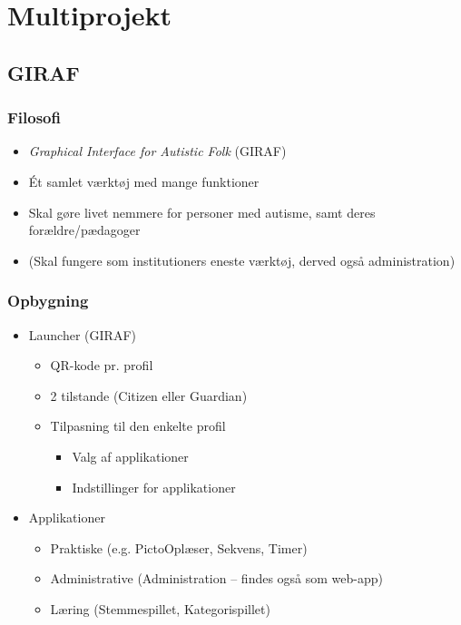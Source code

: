 \section{Multiprojekt}

\subsection{GIRAF}

\begin{frame}
\frametitle{Filosofi}

\begin{itemize}
\item \textit{Graphical Interface for Autistic Folk} (GIRAF)
\item Ét samlet værktøj med mange funktioner
\item Skal gøre livet nemmere for personer med autisme, samt deres forældre/pædagoger
\item (Skal fungere som institutioners eneste værktøj, derved også administration)
\end{itemize}

\end{frame}

\begin{frame}
\frametitle{Opbygning}

\begin{itemize}
\item Launcher (GIRAF)
\begin{itemize}
\item QR-kode pr. profil
\item 2 tilstande (Citizen eller Guardian)
\item Tilpasning til den enkelte profil
\begin{itemize}
\item Valg af applikationer
\item Indstillinger for applikationer
\end{itemize}
\end{itemize}
\item Applikationer
\begin{itemize}
\item Praktiske (e.g. PictoOplæser, Sekvens, Timer)
\item Administrative (Administration -- findes også som web-app)
\item Læring (Stemmespillet, Kategorispillet)
\end{itemize}
\end{itemize}

\end{frame}

